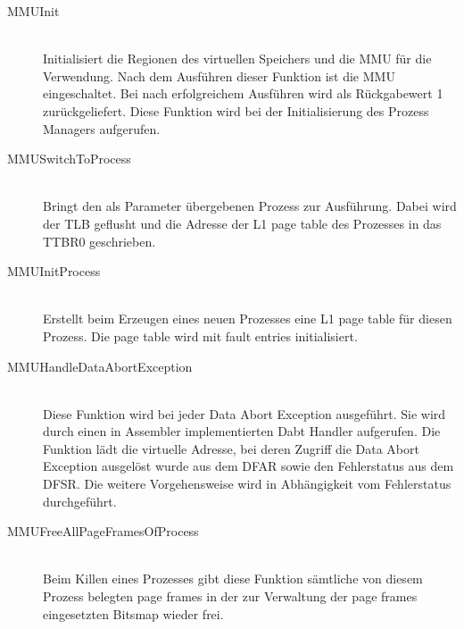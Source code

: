 \begin{description}
	\item[MMUInit] \hfill \\ Initialisiert die Regionen des virtuellen Speichers und die MMU für die Verwendung. Nach dem Ausführen dieser Funktion ist die MMU eingeschaltet. Bei nach erfolgreichem Ausführen wird als Rückgabewert 1 zurückgeliefert. Diese Funktion wird bei der Initialisierung des Prozess Managers aufgerufen.
	\item[MMUSwitchToProcess] \hfill \\ Bringt den als Parameter übergebenen Prozess zur Ausführung. Dabei wird der TLB geflusht und die Adresse der L1 page table des Prozesses in das TTBR0 geschrieben. 
	\item[MMUInitProcess] \hfill \\ Erstellt beim Erzeugen eines neuen Prozesses eine L1 page table für diesen Prozess. Die page table wird mit fault entries initialisiert.
	\item[MMUHandleDataAbortException] \hfill \\ Diese Funktion wird bei jeder Data Abort Exception ausgeführt. Sie wird durch einen in Assembler implementierten Dabt Handler aufgerufen. Die Funktion lädt die virtuelle Adresse, bei deren Zugriff die Data Abort Exception ausgelöst wurde aus dem \acf{DFAR} sowie den Fehlerstatus aus dem \acf{DFSR}. Die weitere Vorgehensweise wird in Abhängigkeit vom Fehlerstatus durchgeführt.
	\item[MMUFreeAllPageFramesOfProcess] \hfill \\ Beim Killen eines Prozesses gibt diese Funktion sämtliche von diesem Prozess belegten page frames in der zur Verwaltung der page frames eingesetzten Bitsmap wieder frei.
\end{description}

\pagebreak 